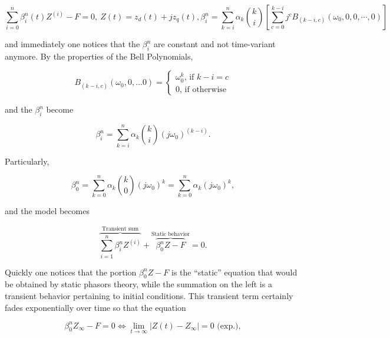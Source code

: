 \begin{equation} \sum\limits_{i=0}^n \beta_i^n(t) Z^{(i)} - F = 0,\ Z(t) = z_d(t) + jz_q(t), \beta_i^n = \sum\limits_{k=i}^{n} \alpha_k{k\choose i} \left[\sum\limits_{c=0}^{k-i} j^cB_{\left(k-i,c\right)}\left(\omega_0,0,0,\cdots,0\right) \right]  \end{equation}

	\noindent and immediately one notices that the $\beta_i^n$ are constant and not time-variant anymore. By the properties of the Bell Polynomials,

\begin{equation} B_{\left(k-i,c\right)}\left(\omega_0,0,...0\right) = \left\{\begin{array}{l} \omega_0^{k} \text{, if } k-i=c \\[2mm] 0 \text{, if otherwise} \end{array}\right. \end{equation}

	\noindent and the $\beta_i^n$ become

\begin{equation} \beta_i^n = \sum\limits_{k=i}^{n} \alpha_k{k\choose i} \left(j\omega_0\right)^{(k-i)} .\end{equation}

	Particularly,

\begin{equation} \beta_0^n = \sum\limits_{k=0}^{n} \alpha_k {k\choose 0} \left(j\omega_0\right)^{k} = \sum\limits_{k=0}^{n} \alpha_k \left(j\omega_0\right)^{k} ,\end{equation}

	\noindent and the model becomes

\begin{equation} \overbrace{\sum\limits_{i=1}^n \beta_i^n Z^{(i)}}^{\text{Transient sum}} + \overbrace{\beta_0^n Z - F}^{\text{Static behavior}} = 0 .\end{equation}

	Quickly one notices that the portion $\beta_0^n Z - F$ is the ``static'' equation that would be obtained by static phasors theory, while the summation on the left is a transient behavior pertaining to initial conditions. This transient term certainly fades exponentially over time so that the equation

\begin{equation} \beta_0^n Z_\infty - F = 0 \Leftrightarrow \lim\limits_{t\to\infty} \left\lvert Z(t) - Z_\infty\right\rvert = 0 \text{ (exp.)},\end{equation}

